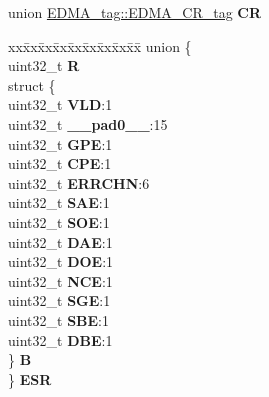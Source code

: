 \begin{DoxyCompactItemize}
\item 
\mbox{\label{structEDMA__tag_aa3af1140ccb4c1ed2bb725f728864e6c}} 
union \mbox{\hyperlink{unionEDMA__tag_1_1EDMA__CR__tag}{E\+D\+M\+A\+\_\+tag\+::\+E\+D\+M\+A\+\_\+\+C\+R\+\_\+tag}} {\bfseries CR}
\item 
\mbox{\label{structEDMA__tag_a2073ef21af309b5e4d782e9d3b14c6e9}} 
\begin{tabbing}
xx\=xx\=xx\=xx\=xx\=xx\=xx\=xx\=xx\=\kill
union \{\\
\>uint32\_t {\bfseries R}\\
\>struct \{\\
\>\>uint32\_t {\bfseries VLD}:1\\
\>\>uint32\_t {\bfseries \_\_pad0\_\_}:15\\
\>\>uint32\_t {\bfseries GPE}:1\\
\>\>uint32\_t {\bfseries CPE}:1\\
\>\>uint32\_t {\bfseries ERRCHN}:6\\
\>\>uint32\_t {\bfseries SAE}:1\\
\>\>uint32\_t {\bfseries SOE}:1\\
\>\>uint32\_t {\bfseries DAE}:1\\
\>\>uint32\_t {\bfseries DOE}:1\\
\>\>uint32\_t {\bfseries NCE}:1\\
\>\>uint32\_t {\bfseries SGE}:1\\
\>\>uint32\_t {\bfseries SBE}:1\\
\>\>uint32\_t {\bfseries DBE}:1\\
\>\} {\bfseries B}\\
\} {\bfseries ESR}\\


\end{tabbing}
\end{DoxyCompactItemize}
